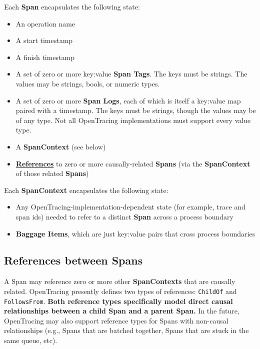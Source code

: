 \documentclass[a4paper,12pt,notitlepage,twoside,openright]{article}
\begin{document}
Each \textbf{Span} encapsulates the following state:

\begin{itemize}

\item
  An operation name
\item
  A start timestamp
\item
  A finish timestamp
\item
  A set of zero or more key:value \textbf{Span Tags}. The keys must be
  strings. The values may be strings, bools, or numeric types.
\item
  A set of zero or more \textbf{Span Logs}, each of which is itself a
  key:value map paired with a timestamp. The keys must be strings,
  though the values may be of any type. Not all OpenTracing
  implementations must support every value type.
\item
  A \textbf{SpanContext} (see below)
\item
  \protect\hyperlink{references-between-spans}{\textbf{References}} to
  zero or more causally-related \textbf{Spans} (via the
  \textbf{SpanContext} of those related \textbf{Spans})
\end{itemize}

Each \textbf{SpanContext} encapsulates the following state:

\begin{itemize}

\item
  Any OpenTracing-implementation-dependent state (for example, trace and
  span ids) needed to refer to a distinct \textbf{Span} across a process
  boundary
\item
  \textbf{Baggage Items}, which are just key:value pairs that cross
  process boundaries
\end{itemize}

\hypertarget{references-between-spans}{%
\subsection{References between
Spans}\label{references-between-spans}}

A Span may reference zero or more other \textbf{SpanContexts} that are
causally related. OpenTracing presently defines two types of references:
\texttt{ChildOf} and \texttt{FollowsFrom}. \textbf{Both reference types
specifically model direct causal relationships between a child Span and
a parent Span.} In the future, OpenTracing may also support reference
types for Spans with non-causal relationships (e.g., Spans that are
batched together, Spans that are stuck in the same queue, etc).
\end{document}
